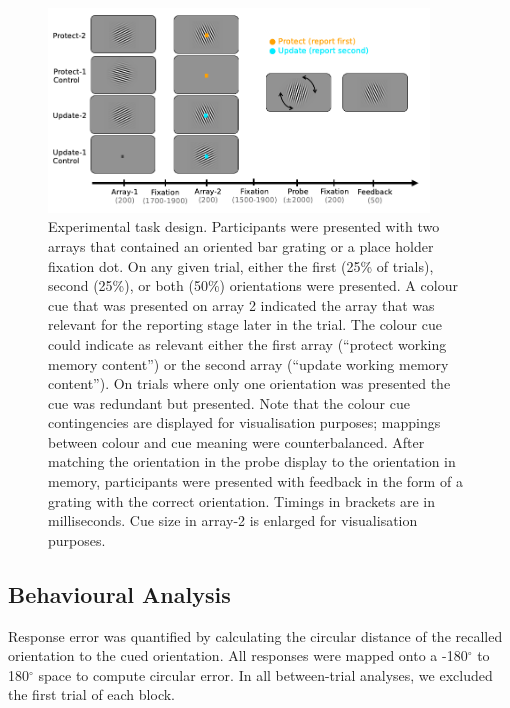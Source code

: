 \documentclass{article}
\begin{document}
\begin{figure}
\centering\includegraphics[width=0.9\textwidth]{figures/task_design.png} 
\caption[Experimental task design.]{Experimental task design. Participants were presented with two arrays that contained an oriented bar grating or a place holder fixation dot. On any given trial, either the first (25\% of trials), second (25\%), or both (50\%) orientations were presented. A colour cue that was presented on array 2 indicated the array that was relevant for the reporting stage later in the trial. The colour cue could indicate as relevant either the first array (“protect working memory content”) or the second array (“update working memory content”). On trials where only one orientation was presented the cue was redundant but presented. Note that the colour cue contingencies are displayed for visualisation purposes; mappings between colour and cue meaning were counterbalanced. After matching the orientation in the probe display to the orientation in memory, participants were presented with feedback in the form of a grating with the correct orientation. Timings in brackets are in milliseconds. Cue size in array-2 is enlarged for visualisation purposes.}
\label{fig:task_design}
\end{figure}


\subsection{Behavioural Analysis}
Response error was quantified by calculating the circular distance of the recalled orientation to the cued orientation. All responses were mapped onto a -180$^{\circ}$ to 180$^{\circ}$ space to compute circular error. In all between-trial analyses, we excluded the first trial of each block.\\
\end{document}
